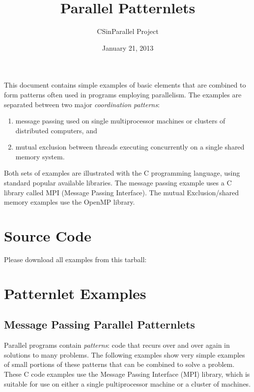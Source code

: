\documentclass[letterpaper,10pt,openany,oneside]{sphinxmanual}
\title{Parallel Patternlets}
\date{January 21, 2013}
\author{CSinParallel Project}
\begin{document}
\maketitle
\tableofcontents
{}\label{index::doc}


This document contains simple examples of basic elements that are combined to form
patterns often used in
programs employing parallelism.  The examples are separated between
two major \emph{coordination patterns}:
\begin{enumerate}
\item {} 
message passing used on single multiprocessor machines or clusters of distributed computers, and

\item {} 
mutual exclusion between threads executing concurrently on a single shared memory system.

\end{enumerate}

Both sets of examples are illustrated
with the C programming language, using standard popular available libraries.
The message passing example uses
a C library called MPI (Message Passing Interface).  The mutual Exclusion/shared memory
examples use the OpenMP library.


\chapter{Source Code}
\label{index:source-code}\label{index:parallel-patternlets}
Please download all examples from this tarball:


\chapter{Patternlet Examples}
\label{index:patternlet-examples}

\section{Message Passing Parallel Patternlets}
\label{MessagePassing/MPI_Patternlets:message-passing-parallel-patternlets}\label{MessagePassing/MPI_Patternlets::doc}
Parallel programs contain \emph{patterns}:  code that recurs over and over again
in solutions to many problems.  The following examples show very simple
examples of small portions of
these patterns that can be combined to solve a problem.  These C code examples use the
Message Passing Interface (MPI) library, which is suitable for use on either a
single pultiprocessor machine or a cluster
of machines.
\end{document}
